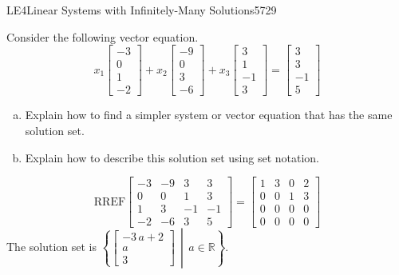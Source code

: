 \begin{exercise}{LE4}{Linear Systems with Infinitely-Many Solutions}{5729} 
\begin{exerciseStatement} 

 Consider the following vector equation. \[       
        x_{1} \left[\begin{array}{c}
-3 \\
0 \\
1 \\
-2
\end{array}\right] + x_{2} \left[\begin{array}{c}
-9 \\
0 \\
3 \\
-6
\end{array}\right] + x_{3} \left[\begin{array}{c}
3 \\
1 \\
-1 \\
3
\end{array}\right] = \left[\begin{array}{c}
3 \\
3 \\
-1 \\
5
\end{array}\right]
      \] 

 

\begin{enumerate}[(a)]
\item  

 Explain how to find a simpler system or vector equation that has the same solution set. 

 
\item  

 Explain how to describe this solution set using set notation. 

 
\end{enumerate}

     \end{exerciseStatement}
 \begin{exerciseAnswer} 

 \[\mathrm{RREF}\left[\begin{array}{ccc|c}
-3 & -9 & 3 & 3 \\
0 & 0 & 1 & 3 \\
1 & 3 & -1 & -1 \\
-2 & -6 & 3 & 5
\end{array}\right]=\left[\begin{array}{ccc|c}
1 & 3 & 0 & 2 \\
0 & 0 & 1 & 3 \\
0 & 0 & 0 & 0 \\
0 & 0 & 0 & 0
\end{array}\right]\] The solution set is \( \left\{ \left[\begin{array}{c}
-3 \, a + 2 \\
a \\
3
\end{array}\right] \,\middle|\, a \in\mathbb R \right\} \). 

 \end{exerciseAnswer}
 \end{exercise}


